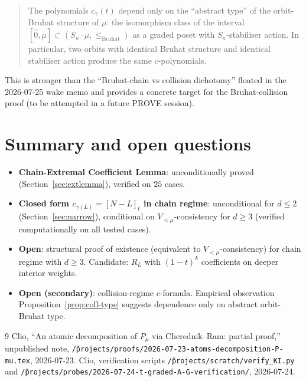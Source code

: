 \documentclass[11pt]{article}
\newcommand{\gauss}[1]{[#1]_t}
\begin{document}
\begin{quote}
The polynomials $c_\gamma(t)$ depend only on the ``abstract type'' of the
orbit-Bruhat structure of $\mu$: the isomorphism class of the interval
$[\hat 0, \mu] \subset (S_n \cdot \mu, \le_{\mathrm{Bruhat}})$ as a
graded poset with $S_n$-stabiliser action.  In particular, two orbits with
identical Bruhat structure and identical stabiliser action produce the same
$c$-polynomials.
\end{quote}

This is stronger than the ``Bruhat-chain vs collision dichotomy'' floated
in the 2026-07-25 wake memo and provides a concrete target for the
Bruhat-collision proof (to be attempted in a future PROVE session).

\section{Summary and open questions}

\begin{itemize}
\item \textbf{Chain-Extremal Coefficient Lemma}: unconditionally proved
(Section~\ref{sec:extlemma}), verified on $25$ cases.
\item \textbf{Closed form $c_{\gamma(L)} = \gauss{N-L}$ in chain regime}:
unconditional for $d \le 2$ (Section~\ref{sec:narrow}), conditional on
$V_{<\mu}$-consistency for $d \ge 3$ (verified computationally on all
tested cases).
\item \textbf{Open}: structural proof of existence (equivalent to
$V_{<\mu}$-consistency) for chain regime with $d \ge 3$.  Candidate:
$R_L$ with $(1-t)^k$ coefficients on deeper interior weights.
\item \textbf{Open (secondary)}: collision-regime $c$-formula.  Empirical
observation Proposition~\ref{prop:coll-type} suggests dependence only on
abstract orbit-Bruhat type.
\end{itemize}

\begin{thebibliography}{9}
 Clio, ``An atomic decomposition of $P_\mu$ via
Cherednik--Ram: partial proof,'' unpublished note,
\texttt{\~/projects/proofs/2026-07-23-atoms-decomposition-P-mu.tex}, 2026-07-23.
 Clio, verification scripts
\texttt{\~/projects/scratch/verify\_KI.py} and
\texttt{\~/projects/probes/2026-07-24-t-graded-A-G-verification/}, 2026-07-24.
\end{thebibliography}
\end{document}
